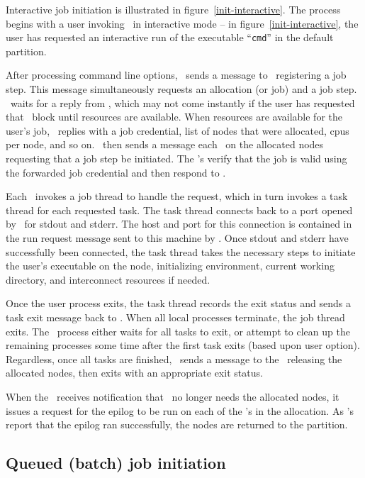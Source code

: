 Interactive job initiation is illustrated in figure~\ref{init-interactive}.
The process begins with a user invoking \srun\ in interactive mode -- in 
figure~\ref{init-interactive}, the user has requested an interactive
run of the executable ``{\tt cmd}'' in the default partition. 

After processing command line options, \srun\ sends a message to
\slurmctld\ registering a job step. This message simultaneously requests
an allocation (or job) and a job step. \srun\ waits for a reply from
\slurmctld , which may not come instantly if the user has requested that
\srun\ block until resources are available. When resources are available
for the user's job, \slurmctld\ replies with a job credential, list of
nodes that were allocated, cpus per node, and so on. \srun\ then sends
a message each \slurmd\ on the allocated nodes requesting that a job
step be initiated. The \slurmd 's verify that the job is valid using
the forwarded job credential and then respond to \srun .

Each \slurmd\ invokes a job thread to handle the request, which in turn
invokes a task thread for each requested task. The task thread connects
back to a port opened by \srun\ for stdout and stderr. The host and
port for this connection is contained in the run request message sent
to this machine by \srun . Once stdout and stderr have successfully 
been connected, the task thread takes the necessary steps to initiate 
the user's executable on the node, initializing environment, current
working directory, and interconnect resources if needed. 

Once the user process exits, the task thread records the exit status and
sends a task exit message back to \srun . When all local processes
terminate, the job thread exits. The \srun\ process either waits
for all tasks to exit, or attempt to clean up the remaining processes
some time after the first task exits (based upon user option). 
Regardless, once all
tasks are finished, \srun\ sends a message to the \slurmctld\ releasing
the allocated nodes, then exits with an appropriate exit status.

When the \slurmctld\ receives notification that \srun\ no longer needs
the allocated nodes, it issues a request for the epilog to be run on each of
the \slurmd 's in the allocation. As \slurmd 's report that the epilog ran
successfully, the nodes are returned to the partition.

\subsection{Queued (batch) job initiation}

